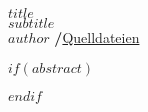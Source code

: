 
  \raggedcolumns
  
\makeatletter
\begin{center}
  \vspace*{0.5cm}
  \textbf{\textsf{\Huge $title$}}\\
  \vspace{0.1cm}
  \textsf{\textit{\large $subtitle$}}\\
  \vspace{0.5cm}
  \textsf{\large $author$ \hspace{0.3cm}\textbf{/}\hspace{0.3cm}\mbox{\large \faGithub\space \href{$source.github$}{Quelldateien}}}
\end{center}
\makeatother
\normalfont

$if(abstract)$
\begin{abstract}
$abstract$
\end{abstract}
$endif$
